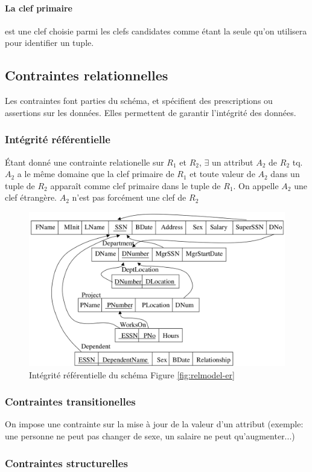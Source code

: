 \documentclass[a4paper]{article}
\begin{document}
\paragraph{La clef primaire} est une clef choisie parmi les clefs candidates comme étant
la seule qu'on utilisera pour identifier un tuple.

\subsection{Contraintes relationnelles}
Les contraintes font parties du schéma, et spécifient des prescriptions ou
assertions sur les données. Elles permettent de garantir l'intégrité des données.

\subsubsection{Intégrité référentielle}
\'Etant donné une contrainte relationelle sur $R_1$ et $R_2$, $\exists$ un attribut
$A_2$ de $R_2$ tq. $A_2$ a le même domaine que la clef primaire de $R_1$ et toute
valeur de $A_2$ dans un tuple de $R_2$ apparaît comme clef primaire dans le tuple
de $R_1$. On appelle $A_2$ une clef étrangère. $A_2$ n'est pas forcément une clef
de $R_2$

\begin{figure}[H]
    \center
    \includegraphics[width=.7\textwidth]{fig/integrite-rel.png}
    \caption{Intégrité référentielle du schéma Figure \ref{fig:relmodel-er}}
\end{figure}

\subsubsection{Contraintes transitionelles}
On impose une contrainte sur la mise à jour de la valeur d'un attribut (exemple:
une personne ne peut pas changer de sexe, un salaire ne peut qu'augmenter...)

\subsubsection{Contraintes structurelles}
\end{document}
